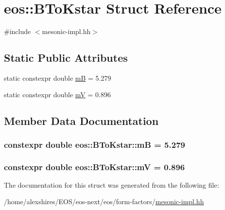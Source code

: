 \hypertarget{structeos_1_1BToKstar}{
\section{eos::BToKstar Struct Reference}
\label{structeos_1_1BToKstar}
}


{\ttfamily \#include $<$mesonic-\/impl.hh$>$}\subsection*{Static Public Attributes}
\begin{DoxyCompactItemize}
\item 
static constexpr double \hyperlink{structeos_1_1BToKstar_aaf3ba74345ac88ef83df9e07fb187d7c}{mB} = 5.279
\item 
static constexpr double \hyperlink{structeos_1_1BToKstar_aaa86a61d90e34af72cb8563491911af3}{mV} = 0.896
\end{DoxyCompactItemize}


\subsection{Member Data Documentation}
\hypertarget{structeos_1_1BToKstar_aaf3ba74345ac88ef83df9e07fb187d7c}{
\subsubsection[{mB}]{\setlength{\rightskip}{0pt plus 5cm}constexpr double {\bf eos::BToKstar::mB} = 5.279}}
\label{structeos_1_1BToKstar_aaf3ba74345ac88ef83df9e07fb187d7c}
\hypertarget{structeos_1_1BToKstar_aaa86a61d90e34af72cb8563491911af3}{
\subsubsection[{mV}]{\setlength{\rightskip}{0pt plus 5cm}constexpr double {\bf eos::BToKstar::mV} = 0.896}}
\label{structeos_1_1BToKstar_aaa86a61d90e34af72cb8563491911af3}


The documentation for this struct was generated from the following file:\begin{DoxyCompactItemize}
\item 
/home/alexshires/EOS/eos-\/next/eos/form-\/factors/\hyperlink{mesonic-impl_8hh}{mesonic-\/impl.hh}\end{DoxyCompactItemize}
